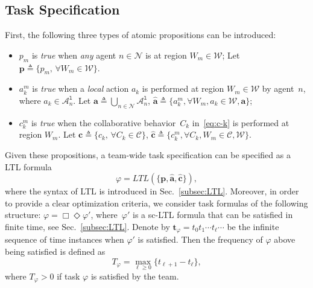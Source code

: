 \subsection{Task Specification}\label{subsec:task-specification}
First, the following three types of atomic propositions can be introduced:
\begin{itemize}
\item $p_m$ is \emph{true} when \emph{any} agent $n\in \mathcal{N}$ is at region $W_m\in \mathcal{W}$;
Let $\mathbf{p}\triangleq \{p_m,\, \forall W_m \in \mathcal{W}\}$.
\item $a^m_k$ is \emph{true} when a \emph{local} action $a_k$ is performed at region $W_m\in\mathcal{W}$ by
 agent~$n$, where $a_k \in \mathcal{A}_n^{\texttt{l}}$.
Let $\mathbf{a} \triangleq \bigcup_{n\in \mathcal{N}}\mathcal{A}^{\texttt{l}}_n$,
$\hat{\mathbf{a}} \triangleq\{a^m_k,\forall W_m, a_k\in \mathcal{W},\mathbf{a}\}$;
\item $c^m_k$ is \emph{true} when the collaborative behavior~$C_k$ in~\eqref{eq:c-k} is performed at region $W_m$.
Let $\mathbf{c}\triangleq \{c_k,\, \forall C_k \in \mathcal{C}\}$,
$\hat{\mathbf{c}} \triangleq\{c^m_k,\forall C_k,W_m\in \mathcal{C},\mathcal{W}\}$.
\end{itemize}
Given these propositions, a team-wide task specification can be specified as a LTL formula
\begin{equation}\label{eq:task}
\varphi=LTL(\{\mathbf{p}, \hat{\mathbf{a}}, \hat{\mathbf{c}}\}),
\end{equation}
where the syntax of LTL is introduced in Sec.~\ref{subsec:LTL}.
Moreover, in order to provide a clear optimization criteria,
we consider task formulas of the following structure:
$\varphi=\Box \Diamond \varphi'$,
where~$\varphi'$ is a sc-LTL formula that can be satisfied in finite time,
see Sec.~\ref{subsec:LTL}.
Denote by $\mathbf{t}_{\varphi}=t_0t_1\cdots t_\ell \cdots$ be the infinite sequence of time instances
when $\varphi'$ is satisfied.
Then the frequency of $\varphi$ above being satisfied is defined as
\begin{equation}\label{eq:task-freq}
T_{\varphi} = \max_{\ell\geq 0} \{t_{\ell+1}-t_{\ell}\},
\end{equation}
where $T_{\varphi}>0$ if task $\varphi$ is satisfied by the team.




